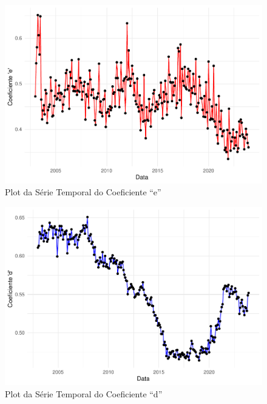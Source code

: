 \documentclass[12pt]{article}
\begin{document}
\newpage

\begin{figure}
\centering
\includegraphics{multiplicadorpt2_files/figure-latex/unnamed-chunk-6-1.pdf}
\caption{Plot da Série Temporal do Coeficiente ``e''}
\end{figure}

\begin{figure}
\centering
\includegraphics{multiplicadorpt2_files/figure-latex/unnamed-chunk-7-1.pdf}
\caption{Plot da Série Temporal do Coeficiente ``d''}
\end{figure}
\end{document}
